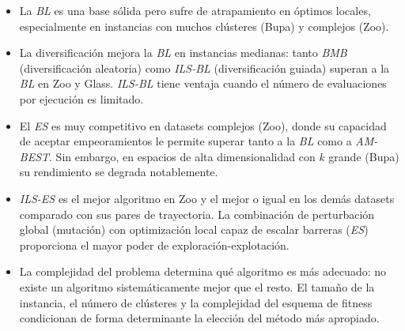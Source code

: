\documentclass[12pt]{article}
\begin{document}
\begin{itemize}
    \item La \textit{BL} es una base sólida pero sufre de atrapamiento en óptimos locales,
    especialmente en instancias con muchos clústeres (Bupa) y complejos (Zoo).
 
    \item La diversificación mejora la \textit{BL} en instancias medianas: tanto \textit{BMB}
    (diversificación aleatoria) como \textit{ILS-BL} (diversificación guiada) superan a la \textit{BL} en
    Zoo y Glass.  \textit{ILS-BL} tiene ventaja cuando el número de evaluaciones por ejecución es limitado.
 
    \item El \textit{ES} es muy competitivo en datasets complejos (Zoo), donde su capacidad
    de aceptar empeoramientos le permite superar tanto a la \textit{BL} como a \textit{AM-BEST}.  Sin embargo,
    en espacios de alta dimensionalidad con $k$ grande (Bupa) su rendimiento se degrada
    notablemente.
 
    \item \textit{ILS-ES} es el mejor algoritmo en Zoo y el mejor o igual en los demás
    datasets comparado con sus pares de trayectoria.  La combinación de perturbación global
    (mutación) con optimización local capaz de escalar barreras (\textit{ES}) proporciona el mayor
    poder de exploración-explotación.
 
    \item La complejidad del problema determina qué algoritmo es más adecuado:
    no existe un algoritmo sistemáticamente mejor que el resto. El tamaño de la instancia, el número de clústeres y
    la complejidad del esquema de fitness condicionan de forma determinante la elección del
    método más apropiado.
\end{itemize}
\end{document}
